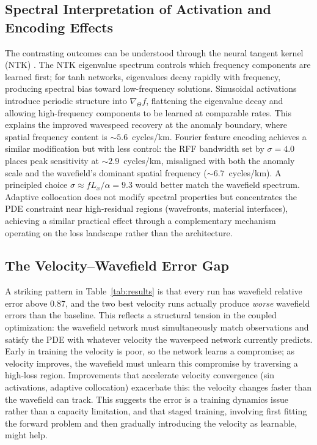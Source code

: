 \documentclass[11pt, letterpaper]{article}
\begin{document}
\subsection{Spectral Interpretation of Activation and Encoding Effects} \label{sec:spectral}
The contrasting outcomes can be understood through the neural tangent kernel (NTK) \citep{jacot2018neural}.
The NTK eigenvalue spectrum controls which frequency components are learned first;
for tanh networks, eigenvalues decay rapidly with frequency, producing spectral bias toward low-frequency solutions.
Sinusoidal activations introduce periodic structure into $\nabla_\Theta f$, flattening the eigenvalue decay and allowing high-frequency components to be learned at comparable rates.
This explains the improved wavespeed recovery at the anomaly boundary, where spatial frequency content is ${\sim}5.6$~cycles/km.
Fourier feature encoding achieves a similar modification but with less control: the RFF bandwidth set by $\sigma = 4.0$ places peak sensitivity at ${\sim}2.9$~cycles/km, misaligned with both the anomaly scale and the wavefield's dominant spatial frequency (${\sim}6.7$~cycles/km).
A principled choice $\sigma \approx fL_x/\alpha = 9.3$ would better match the wavefield spectrum.
Adaptive collocation does not modify spectral properties but concentrates the PDE constraint near high-residual regions (wavefronts, material interfaces), achieving a similar practical effect through a complementary mechanism operating on the loss landscape rather than the architecture.

\subsection{The Velocity--Wavefield Error Gap}
\label{sec:wavefield-gap}

A striking pattern in Table~\ref{tab:results} is that every run has wavefield relative error above 0.87, and the two best velocity runs actually produce \emph{worse} wavefield errors than the baseline.
This reflects a structural tension in the coupled optimization: the wavefield network must simultaneously match observations and satisfy the PDE with whatever velocity the wavespeed network currently predicts.
Early in training the velocity is poor, so the network learns a compromise;
as velocity improves, the wavefield must unlearn this compromise by traversing a high-loss region.
Improvements that accelerate velocity convergence (sin activations, adaptive collocation) exacerbate this: the velocity changes faster than the wavefield can track.
This suggests the error is a training dynamics issue rather than a capacity limitation, and that staged training, involving first fitting the forward problem and then gradually introducing the velocity as learnable, might help.
\end{document}
